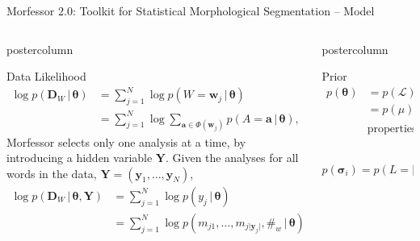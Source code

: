 \documentclass[final]{beamer} %
\newcommand{\mat}[1]{\mathbf{#1}}
\newcommand{\seq}[1]{\boldsymbol{#1}}
\newcommand{\txt}[1]{\textrm{#1}}
\newcommand{\len}[1]{\lvert#1\rvert}
\newcommand{\params}{\boldsymbol{\theta}}
\newcommand{\data}{\seq{D}}
\newcommand{\lexicon}{\mathcal{L}}
\newcommand{\tokenset}{\Phi}
\newcommand{\bound}{\#}
\newcommand{\vb}{\,|\,}
\newcommand{\Y}{\mat{Y}}
\begin{document}
\begin{frame}{Morfessor 2.0: Toolkit for Statistical Morphological Segmentation -- Model}
\begin{columns}
\begin{column}{.4\textwidth}
      \begin{beamercolorbox}[center,wd=\textwidth]{postercolumn}
 \begin{block}{Data Likelihood}
\begin{align*}
  \log p(\data_W \vb \params)
  & = \sum_{j=1}^{N} \log p(W=\seq{w}_j \vb \params) \nonumber \\
  & = \sum_{j=1}^{N} \log \sum_{\seq{a} \in \tokenset(\seq{w}_j)}
  p(A=\seq{a} \vb \params),
\end{align*}
 Morfessor selects only one analysis at a time, by introducing a hidden variable $\Y$. Given the analyses for
all words in the data, $\Y = (\seq{y}_1, \ldots, \seq{y}_N)$,
\begin{align*}
  \log p(\data_W \vb \params, \Y)
  & = \sum_{j=1}^{N} \log 
  p(y_j \vb \params) 
  \\&= \sum_{j=1}^{N} \log 
  p(m_{j1}, \ldots, m_{j\len{\seq{y}_j}}, \bound_w \vb \params) 
\label{eq:morphylikelihood}
\end{align*}

            \end{block}
	\end{beamercolorbox}





\end{column}

\begin{column}{.3\textwidth}

      \begin{beamercolorbox}[center,wd=\textwidth]{postercolumn}
 \begin{block}{Prior}
\begin{align*}
p(\params) & = p(\lexicon)\\ &= p(\mu) \times p(\txt{properties}(m_1), \ldots, \\&\txt{properties}(m_{\mu})) \times \mu!.
\end{align*}

\begin{equation*}
  p(\seq{\sigma}_i) = p(L=\len{\seq{\sigma}_i})
  \prod_{j=1}^{\len{\seq{\sigma}_i}} p(C=\seq{\sigma}_{ij})
\end{equation*}

            \end{block}
	\end{beamercolorbox}

\vfill




\end{column}
\end{columns}
\end{frame}
\end{document}
